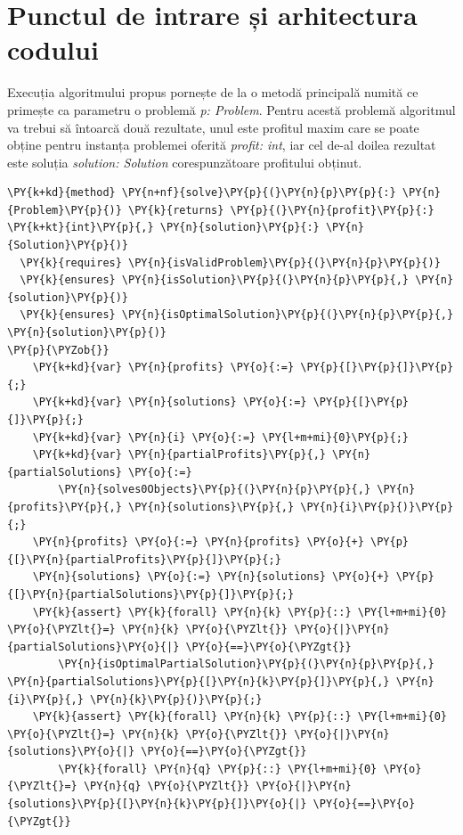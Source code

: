 \begin{sloppypar}
\section{Punctul de intrare și arhitectura codului}

Execuția algoritmului propus pornește de la o metodă principală numită  ce primește ca parametru o problemă \textit{p: Problem}. Pentru acestă problemă algoritmul va trebui să întoarcă două rezultate, unul este profitul maxim care se poate obține pentru instanța problemei oferită \textit{profit: int}, iar cel de-al doilea rezultat este soluția \textit{solution: Solution} corespunzătoare profitului obținut.
\begin{Verbatim}[commandchars=\\\{\}]
\PY{k+kd}{method} \PY{n+nf}{solve}\PY{p}{(}\PY{n}{p}\PY{p}{:} \PY{n}{Problem}\PY{p}{)} \PY{k}{returns} \PY{p}{(}\PY{n}{profit}\PY{p}{:} \PY{k+kt}{int}\PY{p}{,} \PY{n}{solution}\PY{p}{:} \PY{n}{Solution}\PY{p}{)}
  \PY{k}{requires} \PY{n}{isValidProblem}\PY{p}{(}\PY{n}{p}\PY{p}{)}
  \PY{k}{ensures} \PY{n}{isSolution}\PY{p}{(}\PY{n}{p}\PY{p}{,} \PY{n}{solution}\PY{p}{)}
  \PY{k}{ensures} \PY{n}{isOptimalSolution}\PY{p}{(}\PY{n}{p}\PY{p}{,} \PY{n}{solution}\PY{p}{)}
\PY{p}{\PYZob{}}
    \PY{k+kd}{var} \PY{n}{profits} \PY{o}{:=} \PY{p}{[}\PY{p}{]}\PY{p}{;} 
    \PY{k+kd}{var} \PY{n}{solutions} \PY{o}{:=} \PY{p}{[}\PY{p}{]}\PY{p}{;}
    \PY{k+kd}{var} \PY{n}{i} \PY{o}{:=} \PY{l+m+mi}{0}\PY{p}{;}
    \PY{k+kd}{var} \PY{n}{partialProfits}\PY{p}{,} \PY{n}{partialSolutions} \PY{o}{:=} 
        \PY{n}{solves0Objects}\PY{p}{(}\PY{n}{p}\PY{p}{,} \PY{n}{profits}\PY{p}{,} \PY{n}{solutions}\PY{p}{,} \PY{n}{i}\PY{p}{)}\PY{p}{;}
    \PY{n}{profits} \PY{o}{:=} \PY{n}{profits} \PY{o}{+} \PY{p}{[}\PY{n}{partialProfits}\PY{p}{]}\PY{p}{;}
    \PY{n}{solutions} \PY{o}{:=} \PY{n}{solutions} \PY{o}{+} \PY{p}{[}\PY{n}{partialSolutions}\PY{p}{]}\PY{p}{;}
    \PY{k}{assert} \PY{k}{forall} \PY{n}{k} \PY{p}{::} \PY{l+m+mi}{0} \PY{o}{\PYZlt{}=} \PY{n}{k} \PY{o}{\PYZlt{}} \PY{o}{|}\PY{n}{partialSolutions}\PY{o}{|} \PY{o}{==}\PY{o}{\PYZgt{}} 
        \PY{n}{isOptimalPartialSolution}\PY{p}{(}\PY{n}{p}\PY{p}{,} \PY{n}{partialSolutions}\PY{p}{[}\PY{n}{k}\PY{p}{]}\PY{p}{,} \PY{n}{i}\PY{p}{,} \PY{n}{k}\PY{p}{)}\PY{p}{;}
    \PY{k}{assert} \PY{k}{forall} \PY{n}{k} \PY{p}{::} \PY{l+m+mi}{0} \PY{o}{\PYZlt{}=} \PY{n}{k} \PY{o}{\PYZlt{}} \PY{o}{|}\PY{n}{solutions}\PY{o}{|} \PY{o}{==}\PY{o}{\PYZgt{}} 
        \PY{k}{forall} \PY{n}{q} \PY{p}{::} \PY{l+m+mi}{0} \PY{o}{\PYZlt{}=} \PY{n}{q} \PY{o}{\PYZlt{}} \PY{o}{|}\PY{n}{solutions}\PY{p}{[}\PY{n}{k}\PY{p}{]}\PY{o}{|} \PY{o}{==}\PY{o}{\PYZgt{}} 

\end{Verbatim}
\end{sloppypar}
